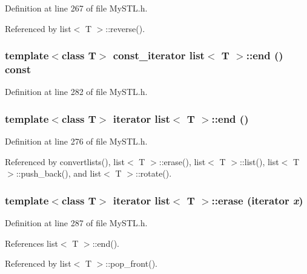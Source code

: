 Definition at line 267 of file MySTL.h.



Referenced by list$<$ T $>$::reverse().

\subsubsection[{end}]{\setlength{\rightskip}{0pt plus 5cm}template$<$class T$>$ {\bf const\_\-iterator} {\bf list}$<$ T $>$::end () const}\label{classlist_ac269b2013f9b85077b6269d99cd62fcd}


Definition at line 282 of file MySTL.h.

\subsubsection[{end}]{\setlength{\rightskip}{0pt plus 5cm}template$<$class T$>$ {\bf iterator} {\bf list}$<$ T $>$::end ()}\label{classlist_a0a0fb2870706f1a5c96500edc5fa8d51}


Definition at line 276 of file MySTL.h.



Referenced by convertlists(), list$<$ T $>$::erase(), list$<$ T $>$::list(), list$<$ T $>$::push\_\-back(), and list$<$ T $>$::rotate().

\subsubsection[{erase}]{\setlength{\rightskip}{0pt plus 5cm}template$<$class T$>$ {\bf iterator} {\bf list}$<$ T $>$::erase ({\bf iterator} {\em x})}\label{classlist_aa7a41fb4c253ddc7ebb822d581670f20}


Definition at line 287 of file MySTL.h.



References list$<$ T $>$::end().



Referenced by list$<$ T $>$::pop\_\-front().

